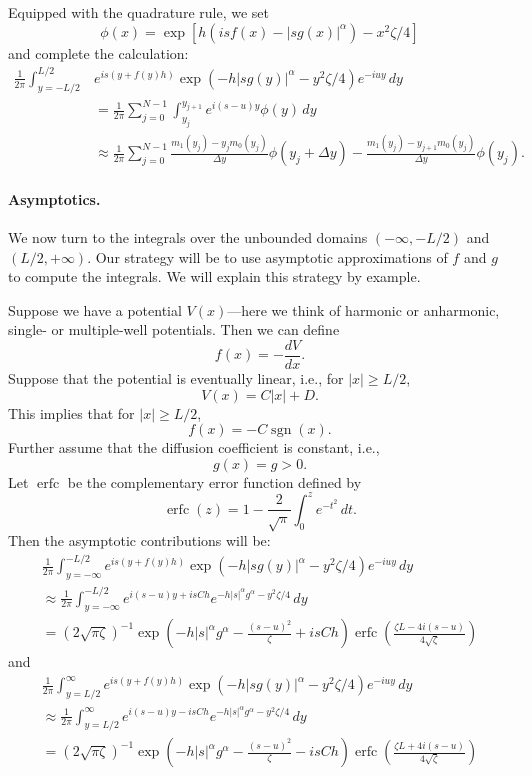 \documentclass[11pt,letterpaper]{article}
\begin{document}
Equipped with the quadrature rule, we set
\[
\phi(x) = \exp \left[ h (i s f(x) - |s g(x) |^\alpha) -x^2 \zeta/4  \right]
\]
and complete the calculation:
\begin{align}
\frac{1}{2 \pi} \int_{y=-L/2}^{L/2} & e^{is\left(y+f(y)h\right)}\exp{\left(  -h |s g(y)|^{\alpha} -y^2 \zeta/4 \right)}e^{-iuy}\, dy \nonumber \\
&= \frac{1}{2 \pi} \sum_{j=0}^{N-1} \int_{y_j}^{y_{j+1}} e^{i (s-u) y} \phi(y) \, dy \nonumber \\
\label{eqn:quadcalc}
&\approx \frac{1}{2 \pi} \sum_{j=0}^{N-1} \frac{m_1(y_j) - y_j m_0(y_j)}{\Delta y} \phi(y_j + \Delta y) - \frac{m_1(y_j) - y_{j+1} m_0(y_j)}{\Delta y} \phi(y_j).
\end{align}

\paragraph{Asymptotics.} We now turn to the integrals over the unbounded domains $(-\infty, -L/2)$ and $(L/2, +\infty)$. Our strategy will be to use asymptotic approximations of $f$ and $g$ to compute the integrals. We will explain this strategy by example.

Suppose we have a potential $V(x)$---here we think of harmonic or anharmonic, single- or multiple-well potentials.  Then we can define
$$
f(x) = -\frac{dV}{dx}.
$$
Suppose that the potential is eventually linear, i.e., for $|x| \geq L/2$,
$$
V(x) = C |x| + D.
$$
This implies that for $|x| \geq L/2$,
$$
f(x) = - C \operatorname{sgn}(x).
$$
Further assume that the diffusion coefficient is constant, i.e.,
$$
g(x) = g > 0.
$$
Let $\operatorname{erfc}$ be the complementary error function defined by
\[
\operatorname{erfc}(z) = 1 - \frac{2}{\sqrt{\pi}} \int_0^z e^{-t^2} \, dt.
\]
Then the asymptotic contributions will be:
\begin{multline}
\frac{1}{2 \pi} \int_{y=-\infty}^{-L/2} e^{is\left(y+f(y)h\right)}\exp{\left(  -h |s g(y)|^{\alpha} -y^2 \zeta/4  \right)}e^{-iuy}\, dy \\
\approx \frac{1}{2 \pi} \int_{y=-\infty}^{-L/2} e^{i(s-u)y + i s C h} e^{-h |s|^\alpha g^\alpha -y^2 \zeta/4 } \, dy \\
 =  ( 2 \sqrt{\pi \zeta} )^{-1} 
 \exp \left( -h |s|^\alpha g^\alpha -\frac{(s-u)^2}{\zeta } + i s C h  \right) \operatorname{erfc}\left(\frac{\zeta  L-4 i (s-u)}{4 \sqrt{\zeta }}\right) 
\end{multline}
and
\begin{multline}
\frac{1}{2 \pi} \int_{y=L/2}^{\infty} e^{is\left(y+f(y)h\right)}\exp{\left(  -h |s g(y)|^{\alpha} -y^2 \zeta/4  \right)}e^{-iuy}\, dy \\
\approx \frac{1}{2 \pi} \int_{y=L/2}^{\infty} e^{i(s-u)y - i s C h} e^{-h |s|^\alpha g^\alpha -y^2 \zeta/4 } \, dy \\
 = ( 2 \sqrt{\pi \zeta} )^{-1} 
 \exp \left( -h |s|^\alpha g^\alpha -\frac{(s-u)^2}{\zeta } - i s C h  \right) \operatorname{erfc}\left(\frac{\zeta  L + 4 i (s-u)}{4 \sqrt{\zeta }}\right)
\end{multline}
\end{document}
